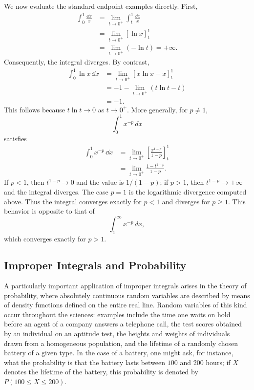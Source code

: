 We now evaluate the standard endpoint examples directly. First,
\[
\begin{aligned}
\int_0^1\frac{\dd x}{x}
&=\lim_{t\to0^+}\int_t^1\frac{\dd x}{x}\\
&=\lim_{t\to0^+}[\ln x]_t^1\\
&=\lim_{t\to0^+}(-\ln t)=+\infty.
\end{aligned}
\]
Consequently, the integral diverges. By contrast,
\[
\begin{aligned}
\int_0^1\ln x\,\dd x
&=\lim_{t\to0^+}[x\ln x-x]_t^1\\
&=-1-\lim_{t\to0^+}(t\ln t-t)\\
&=-1.
\end{aligned}
\]
This follows because $t\ln t\to0$ as $t\to0^+$. More generally, for $p\neq1$, \[
\int_0^1 x^{-p} \, dx
\] satisfies
\[
\begin{aligned}
\int_0^1x^{-p}\,\dd x
&=\lim_{t\to0^+}\left[\frac{x^{1-p}}{1-p}\right]_t^1\\
&=\lim_{t\to0^+}\frac{1-t^{1-p}}{1-p}.
\end{aligned}
\]
If $p<1$, then $t^{1-p}\to0$ and the value is $1/(1-p)$; if
$p>1$, then $t^{1-p}\to+\infty$ and the integral diverges. The case
$p=1$ is the logarithmic divergence computed above. Thus the integral
converges exactly for $p<1$ and diverges for $p\geq1$. This behavior is
opposite to that of \[
\int_1^{\infty} x^{-p} \, dx,
\] which converges exactly for $p>1$.

\subsection{Improper Integrals and Probability}


A particularly important application of improper integrals arises in the theory of probability, where absolutely continuous random variables are described by means of density functions defined on the entire real line. Random variables of this kind occur throughout the sciences: examples include the time one waits on hold before an agent of a company answers a telephone call, the test scores obtained by an individual on an aptitude test, the heights and weights of individuals drawn from a homogeneous population, and the lifetime of a randomly chosen battery of a given type. In the case of a battery, one might ask, for instance, what the probability is that the battery lasts between $100$ and $200$ hours; if $X$ denotes the lifetime of the battery, this probability is denoted by $P(100 \leq X \leq 200)$.

